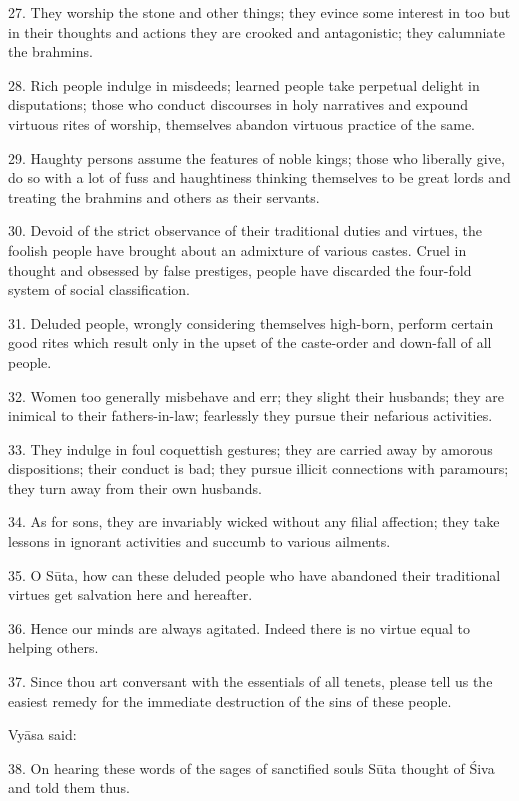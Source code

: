 27. They worship the  stone and other things; they evince some
interest in  too but in their thoughts and actions they are crooked
and antagonistic; they calumniate the brahmins.

28. Rich people indulge in misdeeds; learned people take perpetual delight in
disputations; those who conduct discourses in holy narratives and expound
virtuous rites of worship, themselves abandon virtuous practice of the same.

29. Haughty persons assume the features of noble kings; those who liberally
give, do so with a lot of fuss and haughtiness thinking themselves to be great
lords and treating the brahmins and others as their servants.

30. Devoid of the strict observance of their traditional duties and virtues,
the foolish people have brought about an admixture of various castes. Cruel in
thought and obsessed by false prestiges, people have discarded the four-fold
system of social classification.

31. Deluded people, wrongly considering themselves high-born, perform certain
good rites which result only in the upset of the caste-order and down-fall of
all people.

32. Women too generally misbehave and err; they slight their husbands; they are
inimical to their fathers-in-law; fearlessly they pursue their nefarious
activities.

33. They indulge in foul coquettish gestures; they are carried away by amorous
dispositions; their conduct is bad; they pursue illicit connections with
paramours; they turn away from their own husbands.

34. As for sons, they are invariably wicked without any filial affection; they
take lessons in ignorant activities and succumb to various ailments.

35. O Sūta, how can these deluded people who have abandoned their traditional
virtues get salvation here and hereafter.

36. Hence our minds are always agitated. Indeed there is no virtue equal to
helping others.

37. Since thou art conversant with the essentials of all tenets, please tell us
the easiest remedy for the immediate destruction of the sins of these people.

Vyāsa said:

38. On hearing these words of the sages of sanctified souls Sūta thought of Śiva
and told them thus.
